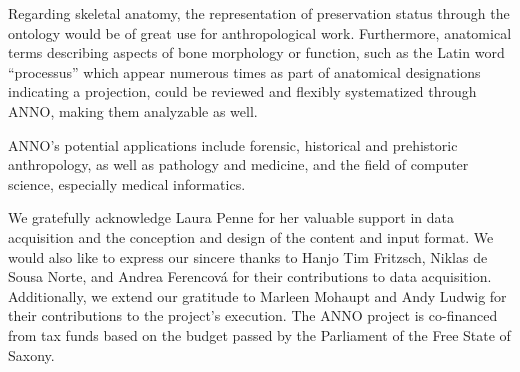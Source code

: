 \documentclass[sw]{iosart2x}
\begin{document}
Regarding skeletal anatomy, the representation of preservation status through the ontology would be of great use for anthropological work.
Furthermore, anatomical terms describing aspects of bone morphology or function, such as the Latin word \enquote{processus} which appear numerous times as part of anatomical designations indicating a projection, could be reviewed and flexibly systematized through ANNO, making them analyzable as well.

ANNO's potential applications include forensic, historical and prehistoric anthropology, as well as pathology and medicine, and the field of computer science, especially medical informatics.

\begin{ack}
\noindent\begin{minipage}{0.90\textwidth}
We gratefully acknowledge Laura Penne for her valuable support in data acquisition and the conception and design of the content and input format.
We would also like to express our sincere thanks to Hanjo Tim Fritzsch, Niklas de Sousa Norte, and Andrea Ferencová for their contributions to data acquisition.
Additionally, we extend our gratitude to Marleen Mohaupt and Andy Ludwig for their contributions to the project's execution.
The ANNO project is co-financed from tax funds based on the budget passed by the Parliament of the Free State of Saxony.


\end{minipage}
\end{ack}
\end{document}

